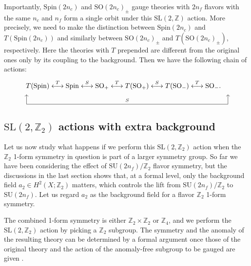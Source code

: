 \documentclass[12pt]{article}
\numberwithin{equation}{section}
\def\bZ{\mathbb{Z}}
\def\SU{\mathrm{SU}}
\def\SO{\mathrm{SO}}
\def\Spin{\mathrm{Spin}}
\def\SL{\mathrm{SL}}
\begin{document}
Importantly, $\Spin(2n_c)$ and $\SO(2n_c)_\pm$  gauge theories with $2n_f$ flavors with the same $n_c$ and $n_f$ form a single orbit under this $\SL(2,\bZ)$ action.
More precisely, we need to make the distinction between $\Spin(2n_c)$ and $T(\Spin(2n_c))$ and  similarly between $\SO(2n_c)_\pm$ and $T(\SO(2n_c)_\pm)$, respectively.
Here the theories with $T$ prepended are different from the original ones only by its coupling to the background.
Then we have the following chain of actions: \begin{equation}
\begin{tikzpicture}
	\node at (0,0) {$
		T(\Spin) \stackrel{T}{\longleftrightarrow} 
		\Spin \stackrel{S}{\longleftrightarrow} 
		\SO_+ \stackrel{T}{\longleftrightarrow} 
		T(\SO_+) \stackrel{S}{\longleftrightarrow} 
		T(\SO_-) \stackrel{T}{\longleftrightarrow} 
		\SO_-.
	$};
	\draw[->] (-5,-1) -- (-5,-0.5);
	\draw[->] (5.4,-1) -- (5.4,-0.5);
	\draw (-5,-1) -- node[above] {\scriptsize $S$} (5.4,-1);
\end{tikzpicture}
\end{equation}

\subsection{$\SL(2,\bZ_2)$ actions with extra background}

Let us now study what happens if we perform this $\SL(2,\bZ_2)$ action when the $\bZ_2$ 1-form symmetry in question is part of a larger symmetry group.
So far we have been considering the effect of $\SU(2n_f)/\bZ_2$ flavor symmetry,
but the discussions in the last section shows that, at a formal level, only the background field $a_2 \in H^2(X;\bZ_2)$ matters, which controls the lift from $\SU(2n_f)/\bZ_2$ to $\SU(2n_f)$.
Let us regard $a_2$ as the background field for a flavor $\bZ_2$ 1-form symmetry.

The combined 1-form symmetry is either $\bZ_2\times \bZ_2$ or $\bZ_4$,
and we perform the $\SL(2,\bZ_2)$ action  by picking a $\bZ_2$ subgroup.
The symmetry and the anomaly of the resulting theory can be determined by a formal argument once those of the original theory 
and the action of the anomaly-free subgroup to be gauged are given \cite{Tachikawa:2017gyf}.
\end{document}
